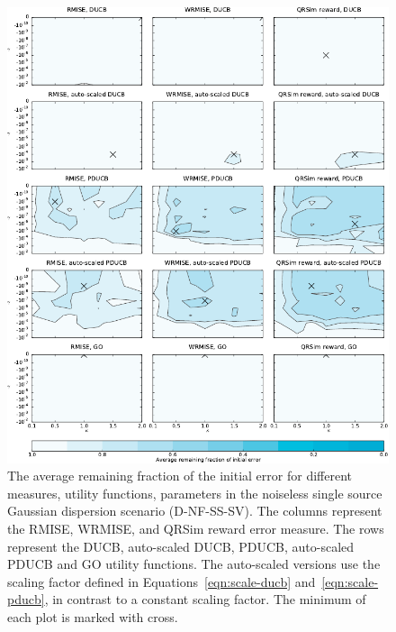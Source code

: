 \begin{figure}
    \centering
    \includegraphics{plots/psearch-D-NF-SS-SV}
    \caption[Remaining fraction of the initial error (D-NF-SS-SV)]{The average 
        remaining fraction of the initial error for different measures, utility 
        functions, parameters in the noiseless single source Gaussian dispersion 
        scenario (D-NF-SS-SV).  The columns represent the RMISE, WRMISE, and 
        QRSim reward error measure.  The rows represent the DUCB, auto-scaled 
        DUCB, PDUCB, auto-scaled PDUCB and GO utility functions. The auto-scaled 
        versions use the scaling factor defined in 
        Equations~\ref{eqn:scale-ducb} and~\ref{eqn:scale-pducb}, in contrast to 
        a constant scaling factor.  The minimum of each plot is marked with 
        cross.}\label{fig:psearch-D-NF-SS-SV}
\end{figure}
